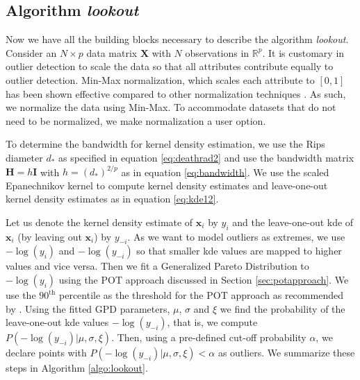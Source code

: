 \documentclass[11pt,a4paper,]{article}
\theoremstyle{definition}
\theoremstyle{definition}
\theoremstyle{definition}
\theoremstyle{remark}
\begin{document}
\hypertarget{algorithm-lookout}{%
\subsection{\texorpdfstring{Algorithm \emph{lookout}}{Algorithm lookout}}\label{algorithm-lookout}}

Now we have all the building blocks necessary to describe the algorithm \emph{lookout}. Consider an \(N \times p\) data matrix \(\bm{X}\) with \(N\) observations in \(\mathbb{R}^p\). It is customary in outlier detection to scale the data so that all attributes contribute equally to outlier detection. Min-Max normalization, which scales each attribute to \([0, 1]\) has been shown effective compared to other normalization techniques \autocite{kandanaarachchi2018normalization}. As such, we normalize the data using Min-Max. To accommodate datasets that do not need to be normalized, we make normalization a user option.

To determine the bandwidth for kernel density estimation, we use the Rips diameter \(d_*\) as specified in equation \eqref{eq:deathrad2} and use the bandwidth matrix \(\bm{H} = h \bm{I}\) with \(h = (d_*)^{2/p}\) as in equation \eqref{eq:bandwidth}. We use the scaled Epanechnikov kernel to compute kernel density estimates and leave-one-out kernel density estimates as in equation \eqref{eq:kde12}.

Let us denote the kernel density estimate of \(\bm{x}_i\) by \(y_i\) and the leave-one-out kde of \(\bm{x}_i\) (by leaving out \(\bm{x}_i\)) by \(y_{-i}\). As we want to model outliers as extremes, we use \(-\log(y_i)\) and \(-\log(y_{-i})\) so that smaller kde values are mapped to higher values and vice versa. Then we fit a Generalized Pareto Distribution to \(-\log(y_i)\) using the POT approach discussed in Section \ref{sec:potapproach}. We use the \(90^{\text{th}}\) percentile as the threshold for the POT approach as recommended by \textcite{bommier2014peaks}. Using the fitted GPD parameters, \(\mu\), \(\sigma\) and \(\xi\) we find the probability of the leave-one-out kde values \(-\log(y_{-i})\), that is, we compute \(P\left(-\log(y_{-i})|\mu, \sigma,\xi \right)\). Then, using a pre-defined cut-off probability \(\alpha\), we declare points with \(P\left(-\log(y_{-i})|\mu, \sigma,\xi \right) < \alpha\) as outliers. We summarize these steps in Algorithm \ref{algo:lookout}.
\DontPrintSemicolon
\end{document}
